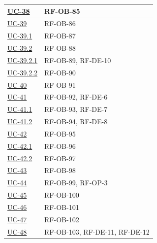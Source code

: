 \documentclass[a4paper,12pt]{article}
\begin{document}
\begin{center}
\begin{longtable}{|>{\centering\arraybackslash}p{5cm}|>{\centering\arraybackslash}p{9cm}|}
\hyperref[subsec:UC-38]{UC-38} & RF-OB-85 \\
\hline

\hyperref[subsec:UC-39]{UC-39} & RF-OB-86 \\
\hline

\hyperref[subsec:UC-39.1]{UC-39.1} & RF-OB-87 \\
\hline

\hyperref[subsec:UC-39.2]{UC-39.2} & RF-OB-88 \\
\hline

\hyperref[subsec:UC-39.2.1]{UC-39.2.1} & RF-OB-89, RF-DE-10 \\
\hline

\hyperref[subsec:UC-39.2.2]{UC-39.2.2} & RF-OB-90 \\
\hline

\hyperref[subsec:UC-40]{UC-40} & RF-OB-91 \\
\hline

\hyperref[subsec:UC-41]{UC-41} & RF-OB-92, RF-DE-6 \\
\hline

\hyperref[subsec:UC-41.1]{UC-41.1} & RF-OB-93, RF-DE-7 \\
\hline

\hyperref[subsec:UC-41.2]{UC-41.2} & RF-OB-94, RF-DE-8 \\
\hline

\hyperref[subsec:UC-42]{UC-42} & RF-OB-95 \\
\hline

\hyperref[subsec:UC-42.1]{UC-42.1} & RF-OB-96 \\
\hline

\hyperref[subsec:UC-42.2]{UC-42.2} & RF-OB-97 \\
\hline

\hyperref[subsec:UC-43]{UC-43} & RF-OB-98 \\
\hline

\hyperref[sec:UC-44]{UC-44} & RF-OB-99, RF-OP-3 \\
\hline

\hyperref[sec:UC-45]{UC-45} & RF-OB-100 \\
\hline

\hyperref[sec:UC-46]{UC-46} & RF-OB-101 \\
\hline

\hyperref[sec:UC-47]{UC-47} & RF-OB-102 \\
\hline

\hyperref[sec:UC-48]{UC-48} & RF-OB-103, RF-DE-11, RF-DE-12 \\
\hline


\end{longtable}
\end{center}
\end{document}
